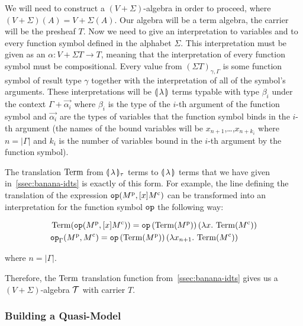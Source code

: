 We will need to construct a $(V+\Sigma)$-algebra in order to proceed, where
$(V+\Sigma)(A) = V + \Sigma(A)$. Our algebra will be a term algebra, the
carrier will be the presheaf $T$. Now we need to give an interpretation to
variables and to every function symbol defined in the alphabet
$\Sigma$. This interpretation must be given as an
$\alpha : V + \Sigma T \to T$, meaning that the interpretation of every
function symbol must be compositional. Every value from
$(\Sigma T)_{\gamma,\Gamma}$ is some function symbol of result type
$\gamma$ together with the interpretation of all of the symbol's
arguments. These interpretations will be $\llparenthesis \, \lambda \, \rrparenthesis$ terms typable
with type $\beta_i$ under the context $\Gamma + \vec{\alpha_i}$ where
$\beta_i$ is the type of the $i$-th argument of the function symbol and
$\vec{\alpha_i}$ are the types of variables that the function symbol binds
in the $i$-th argument (the names of the bound variables will be
$x_{n+1}$,\ldots,$x_{n+k_i}$ where $n = |\Gamma|$ and $k_i$ is the number
of variables bound in the $i$-th argument by the function symbol).

The translation $\operatorname{Term}$ from $\llparenthesis \, \lambda \, \rrparenthesis_\tau$ terms to
$\llparenthesis \, \lambda \, \rrparenthesis$ terms that we have given in~\ref{ssec:banana-idts} is
exactly of this form. For example, the line defining the translation of the
expression $\mathtt{op}(M^{\mathrm{p}}, [x] M^{\mathrm{c}})$ can be transformed into an
interpretation for the function symbol $\mathtt{op}$ the following way:

\begin{align*}
  & \operatorname{Term}(\mathtt{op}(M^{\mathrm{p}}, [x] M^{\mathrm{c}})) =
    \mathtt{op}\,(\operatorname{Term}(M^{\mathrm{p}}))\,(\lambda x.\, \operatorname{Term}(M^{\mathrm{c}})) \\
  & \mathtt{op}_\Gamma(M^{\mathrm{p}}, M^{\mathrm{c}}) =
    \mathtt{op}\,(\operatorname{Term}(M^{\mathrm{p}}))\,(\lambda x_{n+1}.\, \operatorname{Term}(M^{\mathrm{c}})) \\
\end{align*}

where $n = |\Gamma|$.

Therefore, the $\operatorname{Term}$ translation function from~\ref{ssec:banana-idts}
gives us a $(V+\Sigma)$-algebra $\mathcal{T}$ with carrier $T$.



\subsubsection{Building a Quasi-Model}
\label{sssec:quasi-model}

